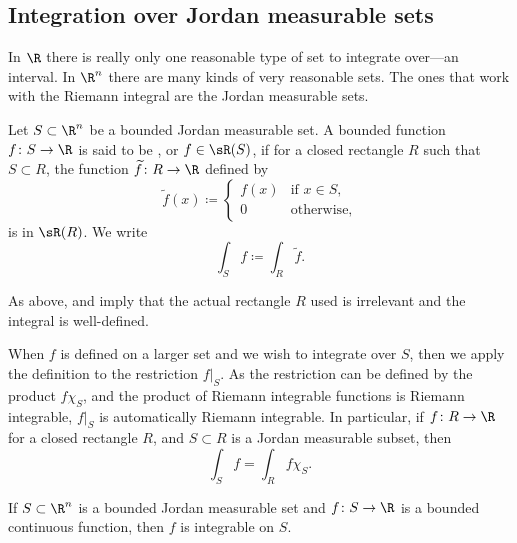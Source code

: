 \subsection{Integration over Jordan measurable sets}

In $\R$ there is really only one reasonable type of set to
integrate over---an interval.
In $\R^n$ there are many kinds of very reasonable sets.  The ones
that work with the Riemann integral are the Jordan measurable sets.

\begin{defn}
Let $S \subset \R^n$ be a bounded Jordan measurable set.
A bounded function $f \colon S \to \R$
is said to be
\emph{},
or $f \in \sR(S)$, if for a closed
rectangle $R$ such that $S \subset R$, the function $\widetilde{f} \colon R
\to \R$ defined by
\begin{equation*}
\widetilde{f}(x) \coloneqq
\begin{cases}
f(x) & \text{if } x \in S, \\
0 & \text{otherwise},
\end{cases}
\end{equation*}
is in $\sR(R)$.  We write
%
\begin{equation*}
\int_S f \coloneqq \int_R \widetilde{f}.
\end{equation*}
\end{defn}

As above,
and  imply that
the actual rectangle $R$  used is irrelevant and
the integral is well-defined.

When $f$ is defined on a larger set and we wish to integrate over $S$, then
we apply the definition to the restriction $f|_S$.
As the restriction can be defined by the product $f\chi_S$, and the product
of Riemann integrable functions is Riemann integrable, $f|_S$ is automatically
Riemann integrable.
  In particular, 
if $f \colon R \to \R$ for a closed rectangle $R$, and $S \subset R$ is
a Jordan measurable subset, then
\begin{equation*}
\int_S f = \int_R f \chi_S .
\end{equation*}

\begin{prop}
If $S \subset \R^n$ is a bounded Jordan measurable set and $f \colon S \to \R$
is a bounded continuous function, then $f$ is integrable on $S$.
\end{prop}

